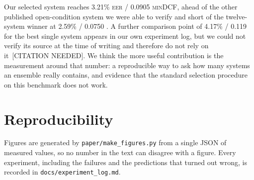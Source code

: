 \documentclass[11pt,a4paper]{article}
\newcommand{\eer}{\textsc{eer}}
\newcommand{\mindcf}{\textsc{minDCF}}
\begin{document}
Our selected system reaches 3.21\% \eer{} / 0.0905 \mindcf{}, ahead of the other published
open-condition system we were able to verify \citep[4.04\% / 0.115]{szuafs} and short of the
twelve-system winner at 2.59\% / 0.0750 \citep{ustc2024}. A further comparison point of 4.17\% /
0.119 for the best single system appears in our own experiment log, but we could not verify its
source at the time of writing and therefore do not rely on it~[CITATION NEEDED]. We think the more
useful contribution is the measurement around that number: a reproducible way to ask how many systems
an ensemble really contains, and evidence that the standard selection procedure on this benchmark
does not work.

\section*{Reproducibility}

Figures are generated by \texttt{paper/make\_figures.py} from a single JSON of measured values, so no
number in the text can disagree with a figure. Every experiment, including the failures and the
predictions that turned out wrong, is recorded in \texttt{docs/experiment\_log.md}.



\end{document}
